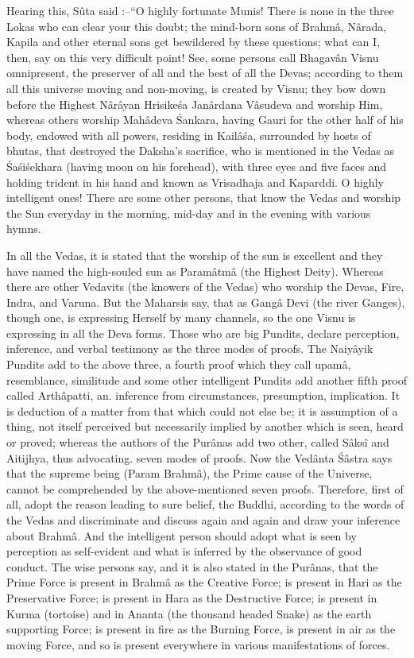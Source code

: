 Hearing this, S\^uta said :--``O highly fortunate Munis! There is none in the three Lokas who can clear your this doubt; the mind-born sons of Brahm\^a, N\^arada, Kapila and other eternal sons get bewildered by these questions; what can I, then, say on this very difficult point! See, some persons call Bhagav\^an Visnu omnipresent, the preserver of all and the best of all the Devas; according to them all this universe moving and non-moving, is created by Visnu; they bow down before the Highest N\^ar\^ayan Hrisike\'sa Jan\^ardana V\^asudeva and worship Him, whereas others worship Mah\^adeva \'Sankara, having Gauri for the other half of his body, endowed with all powers, residing in Kail\^a\'sa, surrounded by hosts of bhutas, that destroyed the Daksha's sacrifice, who is mentioned in the Vedas as \'Sa\'si\'sekhara (having moon on his forehead), with three eyes and five faces and holding trident in his hand and known as Vrisadhaja and Kaparddi. O highly intelligent ones! There are some other persons, that know the Vedas and worship the Sun everyday in the morning, mid-day and in the evening with various hymns.

In all the Vedas, it is stated that the worship of the sun is excellent and they have named the high-souled sun as Param\^atm\^a (the Highest Deity). Whereas there are other Vedavits (the knowers of the Vedas) who worship the Devas, Fire, Indra, and Varuna. But the Maharsis say, that as Gang\^a Devi (the river Ganges), though one, is expressing Herself by many channels, so the one Visnu is expressing in all the Deva forms. Those who are big Pundits, declare perception, inference, and verbal testimony as the three modes of proofs. The Naiy\^ayik Pundits add to the above three, a fourth proof which they call upam\^a, resemblance, similitude and some other intelligent Pundits add another fifth proof called Arth\^apatti, an. inference from circumstances, presumption, implication. It is deduction of a matter from that which could not else be; it is assumption of a thing, not itself perceived but necessarily implied by another which is seen, heard or proved; whereas the authors of the Pur\^anas add two other, called S\^aks\^i and Aitijhya, thus advocating. seven modes of proofs. Now the Ved\^anta \'S\^astra says that the supreme being (Param Brahm\^a), the Prime cause of the Universe, cannot be comprehended by the above-mentioned seven proofs. Therefore, first of all, adopt the reason leading to sure belief, the Buddhi, according to the words of the Vedas and discriminate and discuss again and again and draw your inference about Brahm\^a. And the intelligent person should adopt what is seen by perception as self-evident and what is inferred by the observance of good conduct. The wise persons say, and it is also stated in the Pur\^anas, that the Prime Force is present in Brahm\^a as the Creative Force; is present in Hari as the Preservative Force; is present in Hara as the Destructive Force; is present in Kurma (tortoise) and in Ananta (the thousand headed Snake) as the earth supporting Force; is present in fire as the Burning Force, is present in air as the moving Force, and so is present everywhere in various manifestations of forces.

